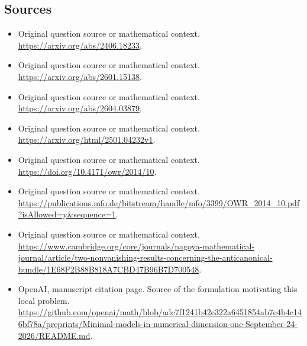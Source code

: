 \documentclass[11pt]{article}
\begin{document}
\subsection{Sources}
\begin{itemize}
\item[S1] Original question source or mathematical context.
\url{https://arxiv.org/abs/2406.18233}.
\item[S2] Original question source or mathematical context.
\url{https://arxiv.org/abs/2601.15138}.
\item[S3] Original question source or mathematical context.
\url{https://arxiv.org/abs/2604.03879}.
\item[S4] Original question source or mathematical context.
\url{https://arxiv.org/html/2501.04232v1}.
\item[S5] Original question source or mathematical context.
\url{https://doi.org/10.4171/owr/2014/10}.
\item[S6] Original question source or mathematical context.
\url{https://publications.mfo.de/bitstream/handle/mfo/3399/OWR_2014_10.pdf?isAllowed=y&sequence=1}.
\item[S7] Original question source or mathematical context.
\url{https://www.cambridge.org/core/journals/nagoya-mathematical-journal/article/two-nonvanishing-results-concerning-the-anticanonical-bundle/1E68F2B88B818A7CBD47B96B7D700548}.
\item[S8] OpenAI, manuscript citation page. Source of the formulation motivating this local problem.
\url{https://github.com/openai/math/blob/adc7f1241b42e322a6451854ab7e4b4c146bf78a/preprints/Minimal-models-in-numerical-dimension-one-September-24-2026/README.md}.
\end{itemize}
\end{document}
